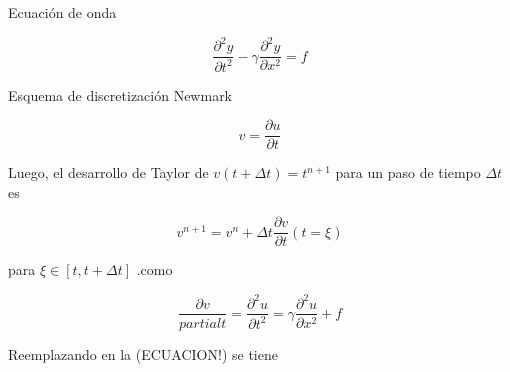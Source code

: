 Ecuación de onda

\begin{equation}
\dfrac{\partial^2 y}{\partial t^2} - \gamma \dfrac{\partial^2 y}{\partial x^2} = f
\end{equation} 

Esquema de discretización Newmark

\begin{equation}
v = \dfrac{\partial u}{\partial t}
\end{equation}

Luego, el desarrollo de Taylor de $v(t+ \Delta t) = t^{n+1}$ para un paso de tiempo $\Delta t$ es

\begin{equation}
v^{n+1} = v^{n} + \Delta t \dfrac{\partial v}{\partial t} (t= \xi)
\end{equation}

para $\xi \in [t,t+\Delta t]$ .como

\begin{equation}
\dfrac{\partial v}{partial t} = \dfrac{\partial^2 u}{\partial t^2} = \gamma \dfrac{\partial^2 u}{\partial x^2} + f 
\end{equation}

Reemplazando en la (ECUACION!) se tiene 